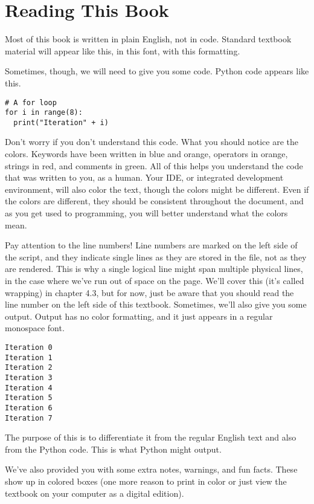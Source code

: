 \section{Reading This Book}
Most of this book is written in plain English, not in code. Standard textbook material will appear like this, in this font, with this formatting.\par
Sometimes, though, we will need to give you some code. Python code appears like this.
\begin{lstlisting}[style=pippython]
# A for loop
for i in range(8):
  print("Iteration" + i)
\end{lstlisting}
Don't worry if you don't understand this code. What you should notice are the colors. Keywords have been written in blue and orange, operators in orange, strings in red, and comments in green. All of this helps you understand the code that was written to you, as a human. Your IDE, or integrated development environment, will also color the text, though the colors might be different. Even if the colors are different, they should be consistent throughout the document, and as you get used to programming, you will better understand what the colors mean.\par
Pay attention to the line numbers! Line numbers are marked on the left side of the script, and they indicate single lines as they are stored in the file, not as they are rendered. This is why a single logical line might span multiple physical lines, in the case where we've run out of space on the page. We'll cover this (it's called wrapping) in chapter 4.3, but for now, just be aware that you should read the line number on the left side of this textbook.
Sometimes, we'll also give you some output. Output has no color formatting, and it just appears in a regular monospace font.
\begin{lstlisting}[style=none]
Iteration 0
Iteration 1
Iteration 2
Iteration 3
Iteration 4
Iteration 5
Iteration 6
Iteration 7
\end{lstlisting}
The purpose of this is to differentiate it from the regular English text and also from the Python code. This is what Python might output.\par
We've also provided you with some extra notes, warnings, and fun facts. These show up in colored boxes (one more reason to print in color or just view the textbook on your computer as a digital edition).
\par{}
\par{}
\par{}
